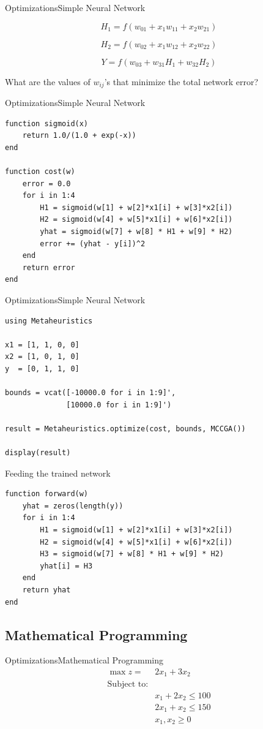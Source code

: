 \documentclass[11pt]{beamer}
\begin{document}
\begin{frame}[fragile]{Optimizations}{Simple Neural Network}

$$
H_1 = f(w_{01} + x_1w_{11} + x_2w_{21})
$$

$$
H_2 = f(w_{02} + x_1w_{12} + x_2w_{22})
$$

$$
Y = f(w_{03} + w_{31}H_1 + w_{32}H_2)
$$

What are the values of $w_{ij}$'s that minimize the total network error?
\end{frame}

\begin{frame}[fragile]{Optimizations}{Simple Neural Network}
\begin{lstlisting}[basicstyle=\tiny]
function sigmoid(x)
	return 1.0/(1.0 + exp(-x))
end 

function cost(w)
	error = 0.0
	for i in 1:4
		H1 = sigmoid(w[1] + w[2]*x1[i] + w[3]*x2[i])
		H2 = sigmoid(w[4] + w[5]*x1[i] + w[6]*x2[i])
		yhat = sigmoid(w[7] + w[8] * H1 + w[9] * H2)
		error += (yhat - y[i])^2
	end 
	return error 
end 
\end{lstlisting}
\end{frame}

\begin{frame}[fragile]{Optimizations}{Simple Neural Network}
\begin{lstlisting}[basicstyle=\small]
using Metaheuristics 

x1 = [1, 1, 0, 0]
x2 = [1, 0, 1, 0]
y  = [0, 1, 1, 0]

bounds = vcat([-10000.0 for i in 1:9]', 
			  [10000.0 for i in 1:9]')

result = Metaheuristics.optimize(cost, bounds, MCCGA())

display(result)
\end{lstlisting}
\end{frame}

\begin{frame}[fragile]{Feeding the trained network}
\begin{lstlisting}[basicstyle=\small]
function forward(w)
	yhat = zeros(length(y))
	for i in 1:4
		H1 = sigmoid(w[1] + w[2]*x1[i] + w[3]*x2[i])
		H2 = sigmoid(w[4] + w[5]*x1[i] + w[6]*x2[i])
		H3 = sigmoid(w[7] + w[8] * H1 + w[9] * H2)
		yhat[i] = H3
	end 
	return yhat
end 
\end{lstlisting}
\end{frame}

\subsection{Mathematical Programming}
\begin{frame}[fragile]{Optimizations}{Mathematical Programming}
$$
\begin{aligned}
\max z = & 2x_1 + 3x_2 \\
\text{Subject to:}\\
& x_1 + 2x_2 \le 100 \\
& 2x_1 + x_2 \le 150 \\
& x_1, x_2 \ge 0
\end{aligned}
$$
\end{frame}
\end{document}
